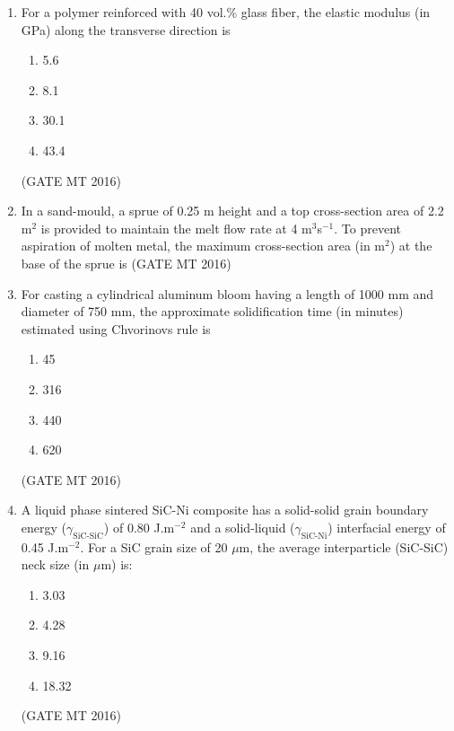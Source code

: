 \documentclass[11pt, letterpaper]{article}
\theoremstyle{remark}
\begin{document}
\begin{enumerate}
\item For a polymer reinforced with 40 vol.\% glass fiber, the elastic modulus (in GPa) along the transverse direction is  

\begin{multicols}{4}
\begin{enumerate}
\item 5.6  
\item 8.1  
\item 30.1  
\item 43.4  
\end{enumerate}
\end{multicols}

\noindent [E$_{\text{glass fiber}}$ = 70 GPa; E$_{\text{polymer}}$ = 3.5 GPa]
\hfill(GATE MT 2016)

\item In a sand-mould, a sprue of 0.25 m height and a top cross-section area of 2.2 m$^{2}$ is provided to maintain the melt flow rate at 4 m$^{3}$s$^{-1}$. To prevent aspiration of molten metal, the maximum cross-section area (in m$^{2}$) at the base of the sprue is 
\hfill(GATE MT 2016)

\item For casting a cylindrical aluminum bloom having a length of 1000 mm and diameter of 750 mm, the approximate solidification time (in minutes) estimated using Chvorinov\textquotesingle s rule is

\begin{multicols}{4}
\begin{enumerate}
\item 45  
\item 316  
\item 440  
\item 620  
\end{enumerate}
\end{multicols}

\hfill(GATE MT 2016)

\item A liquid phase sintered SiC-Ni composite has a solid-solid grain boundary energy ($\gamma_{\text{SiC-SiC}}$) of 0.80 J.m$^{-2}$ and a solid-liquid ($\gamma_{\text{SiC-Ni}}$) interfacial energy of 0.45 J.m$^{-2}$. For a SiC grain size of 20 $\mu$m, the average interparticle (SiC-SiC) neck size (in $\mu$m) is:

\begin{multicols}{4}
\begin{enumerate}
\item 3.03  
\item 4.28  
\item 9.16  
\item 18.32  
\end{enumerate}
\end{multicols}
\hfill(GATE MT 2016)


\end{enumerate}
\end{document}

